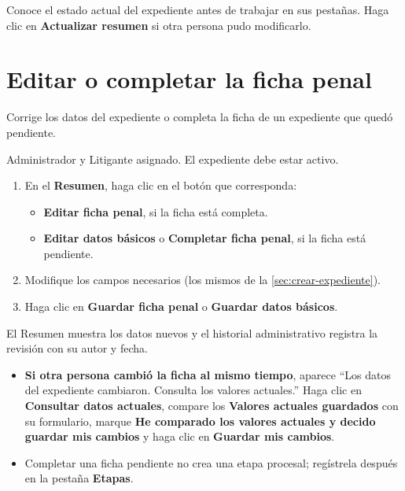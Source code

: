 \resultado Conoce el estado actual del expediente antes de trabajar en sus
pestañas. Haga clic en \textbf{Actualizar resumen} si otra persona pudo
modificarlo.


\section{Editar o completar la ficha penal}\label{sec:editar-ficha}

\paraque Corrige los datos del expediente o completa la ficha de un
expediente que quedó pendiente.

\disponible Administrador y Litigante asignado. El expediente debe estar
activo.

\pasos
\begin{enumerate}
  \item En el \textbf{Resumen}, haga clic en el botón que corresponda:
        \begin{itemize}
          \item \textbf{Editar ficha penal}, si la ficha está completa.
          \item \textbf{Editar datos básicos} o
                \textbf{Completar ficha penal}, si la ficha está pendiente.
        \end{itemize}
  \item Modifique los campos necesarios (los mismos de la
        \cref{sec:crear-expediente}).
  \item Haga clic en \textbf{Guardar ficha penal} o
        \textbf{Guardar datos básicos}.
\end{enumerate}

\resultado El Resumen muestra los datos nuevos y el historial administrativo
registra la revisión con su autor y fecha.

\begin{itemize}
  \item \textbf{Si otra persona cambió la ficha al mismo tiempo}, aparece
        \enquote{Los datos del expediente cambiaron. Consulta los valores
        actuales.} Haga clic en \textbf{Consultar datos actuales}, compare
        los \textbf{Valores actuales guardados} con su formulario, marque
        \textbf{He comparado los valores actuales y decido guardar mis
        cambios} y haga clic en \textbf{Guardar mis cambios}.
  \item Completar una ficha pendiente no crea una etapa procesal; regístrela
        después en la pestaña \textbf{Etapas}.
\end{itemize}

